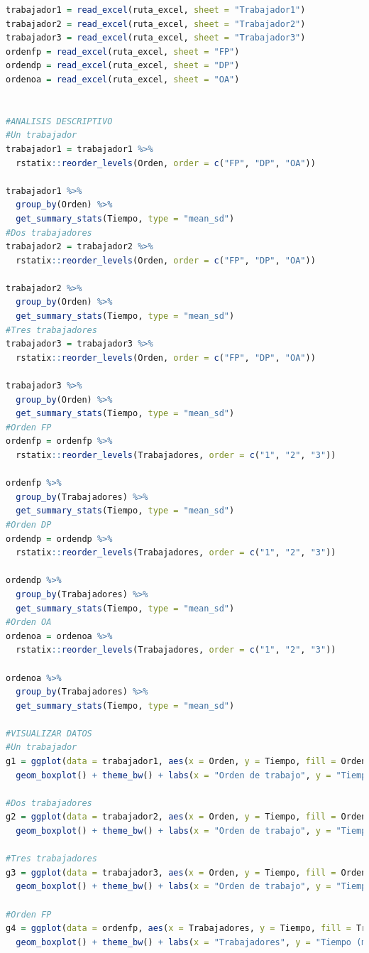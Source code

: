\documentclass{article}
\begin{document}
\begin{lstlisting}[language=R, caption= Código para la prueba estadística ANOVA y ANOVA Welch.]
trabajador1 = read_excel(ruta_excel, sheet = "Trabajador1")
trabajador2 = read_excel(ruta_excel, sheet = "Trabajador2")
trabajador3 = read_excel(ruta_excel, sheet = "Trabajador3")
ordenfp = read_excel(ruta_excel, sheet = "FP")
ordendp = read_excel(ruta_excel, sheet = "DP")
ordenoa = read_excel(ruta_excel, sheet = "OA")


#ANALISIS DESCRIPTIVO
#Un trabajador
trabajador1 = trabajador1 %>%
  rstatix::reorder_levels(Orden, order = c("FP", "DP", "OA"))

trabajador1 %>%
  group_by(Orden) %>%
  get_summary_stats(Tiempo, type = "mean_sd")
#Dos trabajadores
trabajador2 = trabajador2 %>%
  rstatix::reorder_levels(Orden, order = c("FP", "DP", "OA"))

trabajador2 %>%
  group_by(Orden) %>%
  get_summary_stats(Tiempo, type = "mean_sd")
#Tres trabajadores
trabajador3 = trabajador3 %>%
  rstatix::reorder_levels(Orden, order = c("FP", "DP", "OA"))

trabajador3 %>%
  group_by(Orden) %>%
  get_summary_stats(Tiempo, type = "mean_sd")
#Orden FP
ordenfp = ordenfp %>%
  rstatix::reorder_levels(Trabajadores, order = c("1", "2", "3"))

ordenfp %>%
  group_by(Trabajadores) %>%
  get_summary_stats(Tiempo, type = "mean_sd")
#Orden DP
ordendp = ordendp %>%
  rstatix::reorder_levels(Trabajadores, order = c("1", "2", "3"))

ordendp %>%
  group_by(Trabajadores) %>%
  get_summary_stats(Tiempo, type = "mean_sd")
#Orden OA
ordenoa = ordenoa %>%
  rstatix::reorder_levels(Trabajadores, order = c("1", "2", "3"))

ordenoa %>%
  group_by(Trabajadores) %>%
  get_summary_stats(Tiempo, type = "mean_sd")

#VISUALIZAR DATOS
#Un trabajador
g1 = ggplot(data = trabajador1, aes(x = Orden, y = Tiempo, fill = Orden)) + 
  geom_boxplot() + theme_bw() + labs(x = "Orden de trabajo", y = "Tiempo (ms)", title = 'Tiempos para 1 trabajador')

#Dos trabajadores
g2 = ggplot(data = trabajador2, aes(x = Orden, y = Tiempo, fill = Orden)) + 
  geom_boxplot() + theme_bw() + labs(x = "Orden de trabajo", y = "Tiempo (ms)", title = 'Tiempos para 2 trabajadores')

#Tres trabajadores
g3 = ggplot(data = trabajador3, aes(x = Orden, y = Tiempo, fill = Orden)) + 
  geom_boxplot() + theme_bw() + labs(x = "Orden de trabajo", y = "Tiempo (ms)", title = 'Tiempos para 3 trabajadores')

#Orden FP
g4 = ggplot(data = ordenfp, aes(x = Trabajadores, y = Tiempo, fill = Trabajadores)) + 
  geom_boxplot() + theme_bw() + labs(x = "Trabajadores", y = "Tiempo (ms)", title = 'Tiempos para el orden FP')


\end{lstlisting}
\end{document}

